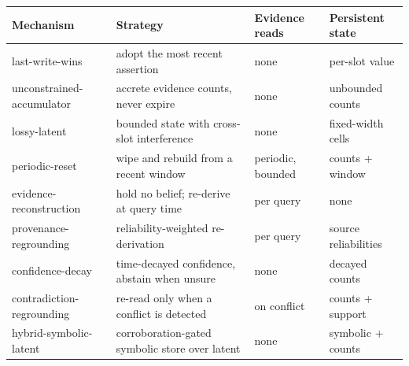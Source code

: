 \begin{tabular}{llll}
\toprule
Mechanism & Strategy & Evidence reads & Persistent state \\
\midrule
last-write-wins & adopt the most recent assertion & none & per-slot value \\
unconstrained-accumulator & accrete evidence counts, never expire & none & unbounded counts \\
lossy-latent & bounded state with cross-slot interference & none & fixed-width cells \\
periodic-reset & wipe and rebuild from a recent window & periodic, bounded & counts + window \\
evidence-reconstruction & hold no belief; re-derive at query time & per query & none \\
provenance-regrounding & reliability-weighted re-derivation & per query & source reliabilities \\
confidence-decay & time-decayed confidence, abstain when unsure & none & decayed counts \\
contradiction-regrounding & re-read only when a conflict is detected & on conflict & counts + support \\
hybrid-symbolic-latent & corroboration-gated symbolic store over latent & none & symbolic + counts \\
\bottomrule
\end{tabular}
